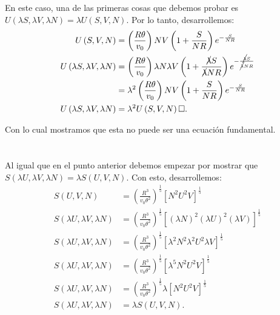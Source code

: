 \documentclass{report}
\begin{document}
En este caso,
una de las primeras cosas que debemos probar es $U\left( \lambda S, \lambda V, \lambda N \right) = \lambda U \left( S, V, N \right) $.
Por lo tanto, desarrollemos:
\begin{align*}
  U\left( S, V, N \right) &= \left( \frac{R\theta}{v_0} \right)NV\left( 1 + \frac{S}{NR} \right) e^{- \frac{S}{NR}} \\
  U\left( \lambda S, \lambda V, \lambda N \right) &= \left( \frac{R\theta}{v_0} \right)\lambda N\lambda V\left( 1 + \frac{\cancel{\lambda} S}{\cancel{\lambda} NR} \right) e^{- \frac{\cancel{\lambda} S}{\cancel{\lambda} NR}} \\
  &=\lambda^2 \left(  \frac{R\theta}{v_0} \right)NV\left( 1 + \frac{S}{NR} \right) e^{- \frac{S}{NR}} \\
  U\left( \lambda S, \lambda V, \lambda N \right) &= \lambda^2 U\left( S, V, N \right) \square
.\end{align*}

Con lo cual mostramos que esta no puede ser una ecuación fundamental.

\section{}

Al igual que en el punto anterior debemos empezar por mostrar que $S\left( \lambda U, \lambda V, \lambda N \right) = \lambda S\left( U, V, N \right) $. Con esto, desarrollemos:
\begin{align*}
  S\left( U, V, N \right) &= \left( \frac{R^{3}}{v_0 \theta^2} \right)^{\frac{1}{5}} \left[ N^2 U^2 V \right]^{\frac{1}{5}} \\
  S\left( \lambda U, \lambda V, \lambda N \right) &= \left( \frac{R^3}{v_0 \theta^2} \right)^{\frac{1}{5}} \left[ \left( \lambda N \right)^2 \left( \lambda U \right)^2 \left( \lambda V \right)  \right]^{\frac{1}{5}} \\
  S\left( \lambda U, \lambda V, \lambda N \right) &= \left( \frac{R^3}{v_0 \theta^2} \right)^{\frac{1}{5}} \left[ \lambda^2 N^2 \lambda^2 U^2 \lambda V  \right]^{\frac{1}{5}} \\
  S\left( \lambda U, \lambda V, \lambda N \right) &= \left( \frac{R^3}{v_0 \theta^2} \right)^{\frac{1}{5}} \left[ \lambda^5 N^2 U^2 V \right]^{\frac{1}{5}} \\
  S\left( \lambda U, \lambda V, \lambda N \right) &= \left( \frac{R^3}{v_0 \theta^2} \right)^{\frac{1}{5}} \lambda \left[ N^2 U^2 V \right]^{\frac{1}{5}} \\
  S\left( \lambda U, \lambda V, \lambda N \right) &= \lambda S\left( U, V, N \right) 
.\end{align*}
\end{document}
